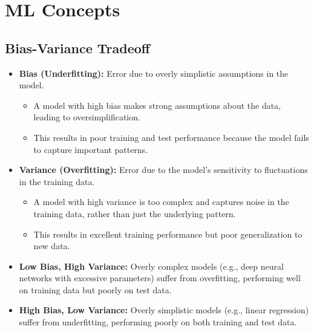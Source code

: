\documentclass{article}
\begin{document}
\begin{definition}
    
\end{definition}

\begin{example}
    
\end{example}
\newpage

\section{ML Concepts}
\subsection{Bias-Variance Tradeoff}
\begin{definition}
    \begin{itemize}
        \item \textbf{Bias (Underfitting):} Error due to overly simplistic assumptions in the model.
        \begin{itemize}
            \item A model with high bias makes strong assumptions about the data, leading to oversimplification.
            \item This results in poor training and test performance because the model fails to capture important patterns.
        \end{itemize}
        \item \textbf{Variance (Overfitting):} Error due to the model's sensitivity to fluctuations in the training data.
        \begin{itemize}
            \item A model with high variance is too complex and captures noise in the training data, rather than just the underlying pattern.
            \item This results in excellent training performance but poor generalization to new data.
        \end{itemize}
        \item \textbf{Low Bias, High Variance:} Overly complex models (e.g., deep neural networks with excessive parameters) suffer from overfitting, performing well on training data but poorly on test data.
        \item \textbf{High Bias, Low Variance:} Overly simplistic models (e.g., linear regression) suffer from underfitting, performing poorly on both training and test data.
    \end{itemize}
\end{definition}
\end{document}
